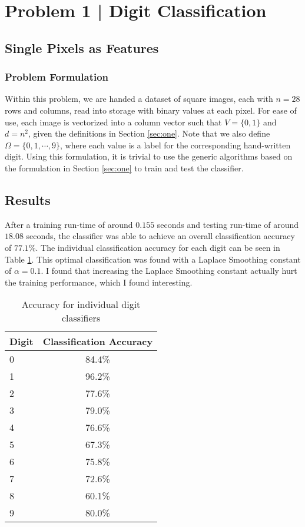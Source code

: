 \documentclass{article}[12pt]
\begin{document}
   
   
   
   
   
   \section{Problem 1 | Digit Classification}
   
   \subsection{Single Pixels as Features} \label{ssec:spf}
   \subsubsection{Problem Formulation}
   Within this problem, we are handed a dataset of square images, each with $n = 28$ rows and columns, read into storage with binary values at each pixel. For ease of use, each image is vectorized into a column vector such that $V = \lbrace 0, 1 \rbrace $ and $d = n^2$, given the definitions in Section \ref{sec:one}. Note that we also define $\Omega = \lbrace 0, 1, \cdots, 9\rbrace$, where each value is a label for the corresponding hand-written digit. Using this formulation, it is trivial to use the generic algorithms based on the formulation in Section \ref{sec:one} to train and test the classifier.
   
   \subsection{Results}
   After a training run-time of around $0.155$ seconds and testing run-time of around $18.08$ seconds, the classifier was able to achieve an overall classification accuracy of $77.1$\%. The individual classification accuracy for each digit can be seen in Table \ref{tab:digacc}. This optimal classification was found with a Laplace Smoothing constant of $\alpha = 0.1$. I found that increasing the Laplace Smoothing constant actually hurt the training performance, which I found interesting. 
   
   \begin{table}[ht]
   	\centering
   	\begin{tabular}{l | c }
   		\hline
   		Digit & Classification Accuracy  \\
   		\hline \hline 
   		0 & 84.4\% \\
   		1 & 96.2\% \\
   		2 & 77.6\% \\
   		3 & 79.0\% \\
   		4 & 76.6\% \\
   		5 & 67.3\% \\
   		6 & 75.8\% \\
   		7 & 72.6\% \\
   		8 & 60.1\% \\
   		9 & 80.0\% \\
   		\hline
   	\end{tabular}
   	\caption{Accuracy for individual digit classifiers} \label{tab:digacc}
   \end{table}
   
\end{document}
